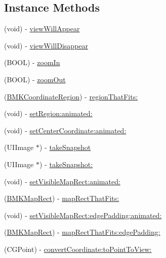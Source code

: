 \subsection*{Instance Methods}
\begin{DoxyCompactItemize}
\item 
(void) -\/ \hyperlink{interface_b_m_k_map_view_a6ce8ac560bd901b93b3e15d6996a409a}{view\+Will\+Appear}
\item 
(void) -\/ \hyperlink{interface_b_m_k_map_view_a0cfbfc217062e84de41ddb04dcad7e67}{view\+Will\+Disappear}
\item 
(B\+O\+O\+L) -\/ \hyperlink{interface_b_m_k_map_view_a349f7c74871a389d73955edd7bcd9fdf}{zoom\+In}
\item 
(B\+O\+O\+L) -\/ \hyperlink{interface_b_m_k_map_view_a1806c818757917ef674ebe5ba24fe5a2}{zoom\+Out}
\item 
(\hyperlink{struct_b_m_k_coordinate_region}{B\+M\+K\+Coordinate\+Region}) -\/ \hyperlink{interface_b_m_k_map_view_a5a1387f64868bf341cbf743063a91d28}{region\+That\+Fits\+:}
\item 
(void) -\/ \hyperlink{interface_b_m_k_map_view_af182240990fe7ad8ff8b709456200fed}{set\+Region\+:animated\+:}
\item 
(void) -\/ \hyperlink{interface_b_m_k_map_view_a02c0933bb56354f30695a6634e416e26}{set\+Center\+Coordinate\+:animated\+:}
\item 
(U\+I\+Image $\ast$) -\/ \hyperlink{interface_b_m_k_map_view_af2af641b86f327aa9f2a16050d380db2}{take\+Snapshot}
\item 
(U\+I\+Image $\ast$) -\/ \hyperlink{interface_b_m_k_map_view_a09fa7c95a30d88f468bcd3492772d63f}{take\+Snapshot\+:}
\item 
(void) -\/ \hyperlink{interface_b_m_k_map_view_ad90d3e9ceabed218dcb90d9fc8247902}{set\+Visible\+Map\+Rect\+:animated\+:}
\item 
(\hyperlink{struct_b_m_k_map_rect}{B\+M\+K\+Map\+Rect}) -\/ \hyperlink{interface_b_m_k_map_view_a58f9c0d783d39cd0d028ae94ca408de8}{map\+Rect\+That\+Fits\+:}
\item 
(void) -\/ \hyperlink{interface_b_m_k_map_view_a1e5a69629b90ac2f571284e2e6c32397}{set\+Visible\+Map\+Rect\+:edge\+Padding\+:animated\+:}
\item 
(\hyperlink{struct_b_m_k_map_rect}{B\+M\+K\+Map\+Rect}) -\/ \hyperlink{interface_b_m_k_map_view_a93e07fbbe602a9a493650158babd2349}{map\+Rect\+That\+Fits\+:edge\+Padding\+:}
\item 
(C\+G\+Point) -\/ \hyperlink{interface_b_m_k_map_view_a46ec1b9f485f41a04ffe76300624f5b4}{convert\+Coordinate\+:to\+Point\+To\+View\+:}

\end{DoxyCompactItemize}
